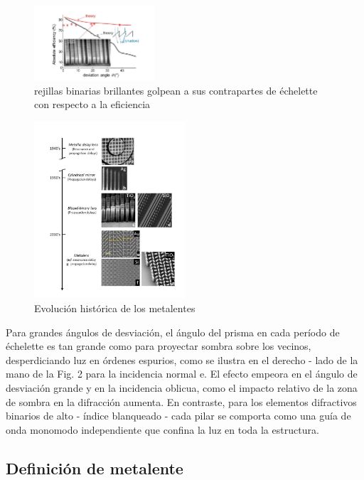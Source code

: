 \documentclass[a4paper, twocolumn, 10pt]{article}
\begin{document}
\begin{figure}[H]
    \centering
    \includegraphics[width= 0.4\textwidth]{nano.png}
    \caption{ rejillas binarias brillantes golpean a sus contrapartes de échelette con respecto a la eficiencia \cite{li2019metalens}}
    \label{metasuperficie}
\end{figure}

\begin{figure}[H]
    \centering
    \includegraphics[width= 0.5\textwidth]{fechas.png}
    \caption{ Evolución histórica de los metalentes \cite{li2019metalens}}
    \label{metasuperficie}
\end{figure}

Para grandes ángulos de desviación, el ángulo del prisma en cada período de échelette es tan grande como para proyectar sombra sobre los vecinos, desperdiciando luz en órdenes espurios, como se ilustra en el derecho - lado de la mano de la Fig. 2 para la incidencia normal e. El efecto empeora en el ángulo de desviación grande y en la incidencia oblicua, como el impacto relativo de la zona de sombra en la difracción aumenta. En contraste, para los elementos difractivos binarios de alto - índice blanqueado - cada pilar se comporta como una guía de onda monomodo independiente que confina la luz en toda la estructura.



\subsection*{Definición de metalente}
\end{document}
